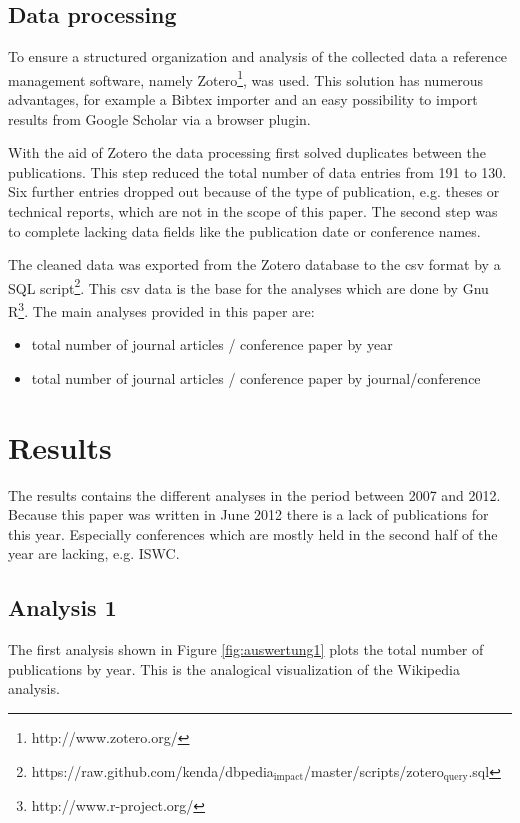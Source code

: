 \documentclass[english]{lni}
\begin{document}
\subsection{Data processing}
\label{sec-2-2}

   To ensure a structured organization and analysis of the collected data a
   reference management software, namely Zotero\footnote{http://www.zotero.org/ }, was used. This solution
   has numerous advantages, for example a Bibtex importer and an easy possibility to import
   results from Google Scholar via a browser plugin.

   With the aid of Zotero the data processing first solved duplicates between
   the publications. This step reduced the total number of data entries from 191
   to 130. Six further entries dropped out because of the type of publication,
   e.g. theses or technical reports, which are not in the scope of this
   paper. The second step was to complete lacking data fields like the
   publication date or conference names.

   The cleaned data was exported from the Zotero database to the csv format by a
   SQL script\footnote{https://raw.github.com/kenda/dbpedia$_{\mathrm{impact}}$/master/scripts/zotero$_{\mathrm{query}}$.sql }. This csv data is the base for the analyses which are done by
   Gnu R\footnote{http://www.r-project.org/ }. The main analyses provided in this paper are:
\begin{itemize}
\item total number of journal articles / conference paper by year
\item total number of journal articles / conference paper by journal/conference
\end{itemize}
\section{Results}
\label{sec-3}

  The results contains the different analyses in the period between 2007
  and 2012. Because this paper was written in June 2012 there is a lack of
  publications for this year. Especially conferences which are mostly held in the
  second half of the year are lacking, e.g. ISWC.
\subsection{Analysis 1}
\label{sec-3-1}

   The first analysis shown in Figure \ref{fig:auswertung1} plots the total
   number of publications by year. This is the analogical visualization of the
   Wikipedia analysis.
\end{document}
